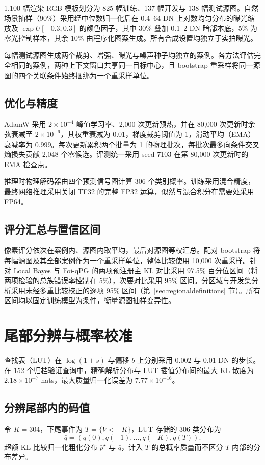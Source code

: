 \documentclass[10pt,twocolumn,journal]{IEEEtran}
\begin{document}
1,100 幅渲染 RGB 模板划分为 825 幅训练、137 幅开发与 138 幅测试源图。自然场景抽样（90\%）采用经中位数归一化后在 0.4--64 DN 上对数均匀分布的曝光缩放及 $\exp U[-0.3,0.3]$ 的颜色因子，其中 30\% 叠加 0.1--2 DN 暗部本底，5\% 为零光控制样本，其余 10\% 由程序化图案生成。所有合成设置均独立于实拍曝光。

每幅测试源图生成两个裁剪、增强、曝光与噪声种子均独立的案例。各方法评估完全相同的案例，两种上下文窗口共享同一目标中心，且 bootstrap 重采样将同一源图的四个关联条件始终捆绑为一个重采样单位。

\subsection{优化与精度}
AdamW 采用 $2\times10^{-4}$ 峰值学习率、2,000 次更新预热，并在 80,000 次更新时余弦衰减至 $2\times10^{-6}$，其权重衰减为 0.01，梯度裁剪阈值为 1，滑动平均（EMA）衰减率为 0.999。每次更新累积两个批量为 1 的物理批次，每批次最多向条件交叉熵损失贡献 2,048 个零候选。评测统一采用 seed 7103 在第 80,000 次更新时的 EMA 检查点。

推理时物理解码器由四个预测信号图计算 306 个类别概率。训练采用混合精度，最终网络推理采用关闭 TF32 的完整 FP32 运算，似然与混合积分在需要处采用 FP64。

\subsection{评分汇总与置信区间}\label{sec:scoreaggregation}
像素评分依次在案例内、源图内取平均，最后对源图等权汇总。配对 bootstrap 将每幅源图及其全部案例作为一个重采样单位，整体比较使用 10,000 次重采样。针对 Local Bayes 与 Foi-qPG 的两项预注册主 KL 对比采用 97.5\% 百分位区间（将两项检验的总族错误率控制在 5\%），次要对比采用 95\% 区间。分区域与开发集分析采用未经多重比较校正的逐项 95\% 区间（第~\ref{sec:regionaldefinitions} 节）。所有区间均以固定训练模型为条件，衡量源图抽样变异性。

\section{尾部分辨与概率校准}
查找表（LUT）在 $\log(1+s)$ 与偏移 $b$ 上分别采用 0.002 与 0.01 DN 的步长。在 152 个归档验证查询中，精确解析分布与 LUT 插值分布间的最大 KL 散度为 $2.18\times10^{-7}$ nats，最大质量归一化误差为 $7.77\times10^{-16}$。

\subsection{分辨尾部内的码值}
令 $K=304$，下尾事件为 $T=\{V<-K\}$，LUT 存储的 306 类分布为
\begin{equation}
\bar q=(q(0),q(-1),\ldots,q(-K),q(T)).
\end{equation}
超额 KL 比较归一化粗化分布 $\bar p^\star$ 与 $\bar q$，计入 $T$ 的总概率质量而不区分 $T$ 内部的分布差异。
\end{document}
